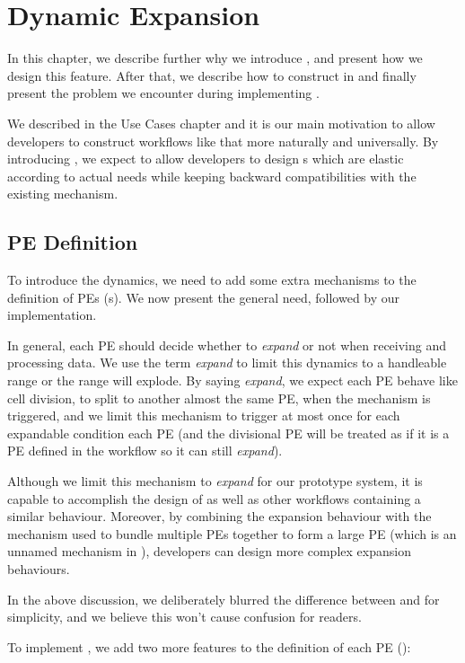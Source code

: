 \chapter{Dynamic Expansion}
In this chapter, we describe further why we introduce \tdynexp, and present how we design this feature. After that, we describe how to construct \tsieve in \tdynexp and finally present the problem we encounter during implementing \tdynexp.

We described \tsieve in the Use Cases chapter and it is our main motivation to allow developers to construct workflows like that more naturally and universally. By introducing \tdynexp, we expect to allow developers to design \tPETmpl{}s which are elastic according to actual needs while keeping backward compatibilities with the existing \dpy mechanism.

\section{PE Definition} \label{sec:dynexp_PE_def}
To introduce the dynamics, we need to add some extra mechanisms to the definition of PEs (\ie \tPETmpl{}s). We now present the general need, followed by our implementation.

In general, each PE should decide whether to \textit{expand} or not when receiving and processing data. We use the term \textit{expand} to limit this dynamics to a handleable range or the range will explode. By saying \textit{expand}, we expect each PE behave like cell division, to split to another almost the same PE, when the mechanism is triggered, and we limit this mechanism to trigger at most once for each expandable condition each PE (and the divisional PE will be treated as if it is a PE defined in the workflow so it can still \textit{expand}).

Although we limit this mechanism to \textit{expand} for our prototype system, it is capable to accomplish the design of \ttsieve as well as other workflows containing a similar behaviour. Moreover, by combining the expansion behaviour with the mechanism used to bundle multiple PEs together to form a large PE (which is an unnamed mechanism in \dpy), developers can design more complex expansion behaviours.

In the above discussion, we deliberately blurred the difference between \tPETmpl and \tPEInst for simplicity, and we believe this won't cause confusion for readers.

To implement \tdynexp, we add two more features to the definition of each PE (\tPETmpl):

